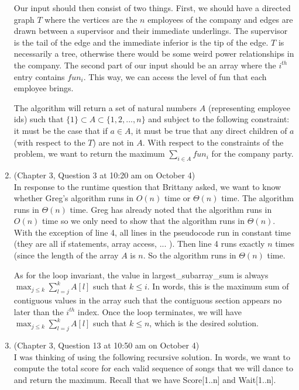 \documentclass{article}
\begin{document}
\begin{enumerate}
        Our input should then consist of two things. First, we should have a directed graph $T$ where the vertices are the $n$ employees of the company and edges are drawn between a supervisor and their immediate underlings. The supervisor is the tail of the edge and the immediate inferior is the tip of the edge. $T$ is necessarily a tree, otherwise there would be some weird power relationships in the company. The second part of our input should be an array where the $i^{th}$ entry contains $fun_i$. This way, we can access the level of fun that each employee brings.

        The algorithm will return a set of natural numbers $A$ (representing employee ids) such that $ \{ 1 \} \subset A \subset \{ 1, 2, ... , n \} $ and subject to the following constraint: it must be the case that if $ a \in A $, it must be true that any direct children of $a$ (with respect to the $T$) are not in $A$. With respect to the constraints of the problem, we want to return the maximum $\sum_{i \in A} fun_i $ for the company party.
    \item (Chapter 3, Question 3 at 10:20 am on October 4) \\
        In response to the runtime question that Brittany asked, we want to know whether Greg's algorithm runs in $O (n)$ time or $\Theta (n)$ time.
        The algorithm runs in $\Theta (n)$ time.
        Greg has already noted that the algorithm runs in $O (n) $ time so we only need to show that the algorithm runs in $\Theta (n) $.
        With the exception of line 4, all lines in the pseudocode run in constant time (they are all if statements, array access, ... ).
        Then line 4 runs exactly $n$ times (since the length of the array $A$ is $n$.
        So the algorithm runs in $\Theta (n)$ time.

        As for the loop invariant, the value in largest\_subarray\_sum is always $\max _{j \leq k} \sum _{l=j}^k A[l] $ such that $k \leq i$.
        In words, this is the maximum sum of contiguous values in the array such that the contiguous section appears no later than the $i^{th}$ index.
        Once the loop terminates, we will have $\max _{j \leq k} \sum _{l=j}^k A[l] $ such that $k \leq n $, which is the desired solution.
    \item (Chapter 3, Question 13 at 10:50 am on October 4) \\
        I was thinking of using the following recursive solution. In words, we want to compute the total score for each valid sequence of songs that we will dance to and return the maximum. Recall that we have Score[1..n] and Wait[1..n].


\end{enumerate}
\end{document}
